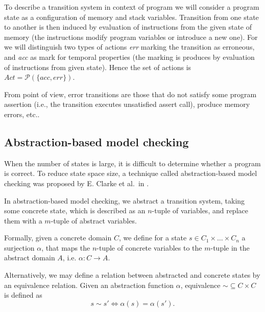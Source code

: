 To describe a transition system in context of \LLVM program we
will consider a program state as a configuration of memory and stack variables.
Transition from one state to another is then induced by evaluation of \LLVM
instructions from the given state of memory (the instructions modify program
variables or introduce a new one). For \DIVINE we will distinguish two types of
actions \emph{err} marking the transition as erroneous, and \emph{acc} as mark
for temporal properties (the marking is produces by evaluation of instructions
from given state). Hence the set of actions is $Act = \mathcal{P}(\{acc, err\})$.

From \LLVM point of view, error transitions are those that do not satisfy some
program assertion (i.e., the transition executes unsatisfied assert call),
produce memory errors, etc..

\subsection{Abstraction-based model checking} \label{subsec:amc}

When the number of states is large, it is difficult to determine whether a
program is correct. To reduce state space size, a technique called
abstraction-based model checking was proposed by E. Clarke et al.~in
\cite{Clarke94}.

In abstraction-based model checking, we abstract a transition system, taking
some concrete state, which is described as an $n$-tuple of variables, and
replace them with a $m$-tuple of abstract variables.

Formally, given a concrete domain $C$, we define for a state $s \in C_1 \times
\dots \times C_n$ a surjection $\alpha$, that maps the $n$-tuple of concrete
variables to the $m$-tuple in the abstract domain $A$, i.e. $\alpha : C
\rightarrow A$.

Alternatively, we may define a relation between abstracted and concrete states by
an equivalence relation. Given an abstraction function $\alpha$, equivalence
${\sim} \subseteq C \times C$ is defined as \[s  \sim s' \iff \alpha(s) =
\alpha(s').\]

